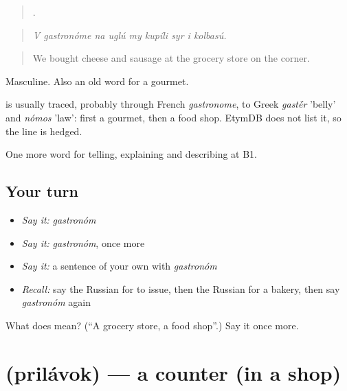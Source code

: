 \begin{quote}
        .
\end{quote}

\begin{quote}
\emph{V gastronóme na uglú my kupíli syr i kolbasú.}
\end{quote}

\begin{quote}
We bought cheese and sausage at the grocery store on the corner.
\end{quote}

Masculine. Also an old word for a gourmet.

\begin{cousinweb}
\emph{} is usually traced, probably through French \emph{gastronome}, to Greek \emph{gast\'{\={e}}r} 'belly' and \emph{nómos} 'law': first a gourmet, then a food shop. EtymDB does not list it, so the line is hedged.
\end{cousinweb}

\begin{grammarlens}[title={What you've built}]
One more word for telling, explaining and describing at B1.
\end{grammarlens}

\subsection*{Your turn}
\begin{itemize}
\raggedright
  \item \emph{Say it:} \emph{gastronóm}
  \item \emph{Say it:} \emph{gastronóm}, once more
  \item \emph{Say it:} a sentence of your own with \emph{gastronóm}
  \item \emph{Recall:} say the Russian for to issue, then the Russian for a bakery, then say \emph{gastronóm} again
\end{itemize}

\begin{tcolorbox}[breakable,colback=teal!4,colframe=teal!35!black,title={Before you move on}]
What does  mean? (\textquotedblleft{}A grocery store, a food shop\textquotedblright{}.) Say it once more.
\end{tcolorbox}
\section[\texorpdfstring{\ru{прилавок} (prilávok)}{прилавок (prilávok)}]{ (prilávok) — a counter (in a shop)}

